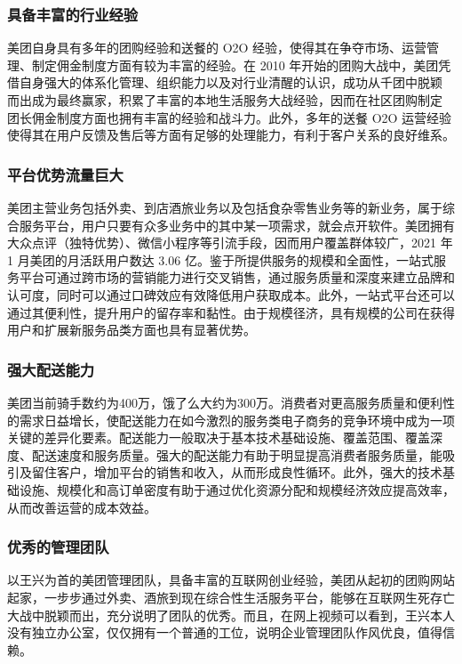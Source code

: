 \documentclass[UTF8,a4paper,12pt,lang=cn,fontset = windows]{elegantpaper} %
\begin{document}
\subsubsection{具备丰富的行业经验}
美团自身具有多年的团购经验和送餐的 O2O 经验，使得其在争夺市场、运营管
理、制定佣金制度方面有较为丰富的经验。在 2010 年开始的团购大战中，美团凭
借自身强大的体系化管理、组织能力以及对行业清醒的认识，成功从千团中脱颖
而出成为最终赢家，积累了丰富的本地生活服务大战经验，因而在社区团购制定
团长佣金制度方面也拥有丰富的经验和战斗力。此外，多年的送餐 O2O 运营经验
使得其在用户反馈及售后等方面有足够的处理能力，有利于客户关系的良好维系。
\subsubsection{平台优势流量巨大}
美团主营业务包括外卖、到店酒旅业务以及包括食杂零售业务等的新业务，属于综合服务平台，用户只要有众多业务中的其中某一项需求，就会点开软件。美团拥有大众点评（独特优势）、微信小程序等引流手段，因而用户覆盖群体较广，2021 年 1 月美团的月活跃用户数达 3.06 亿。鉴于所提供服务的规模和全面性，一站式服务平台可通过跨市场的营销能力进行交叉销售，通过服务质量和深度来建立品牌和认可度，同时可以通过口碑效应有效降低用户获取成本。此外，一站式平台还可以通过其便利性，提升用户的留存率和黏性。由于规模径济，具有规模的公司在获得用户和扩展新服务品类方面也具有显著优势。
\subsubsection{强大配送能力}
美团当前骑手数约为400万，饿了么大约为300万。消费者对更高服务质量和便利性的需求日益增长，使配送能力在如今激烈的服务类电子商务的竞争环境中成为一项关键的差异化要素。配送能力一般取决于基本技术基础设施、覆盖范围、覆盖深度、配送速度和服务质量。强大的配送能力有助于明显提高消费者服务质量，能吸引及留住客户，增加平台的销售和收入，从而形成良性循环。此外，强大的技术基础设施、规模化和高订单密度有助于通过优化资源分配和规模经济效应提高效率，从而改善运营的成本效益。
\subsubsection{优秀的管理团队}
以王兴为首的美团管理团队，具备丰富的互联网创业经验，美团从起初的团购网站起家，一步步通过外卖、酒旅到现在综合性生活服务平台，能够在互联网生死存亡大战中脱颖而出，充分说明了团队的优秀。而且，在网上视频可以看到，王兴本人没有独立办公室，仅仅拥有一个普通的工位，说明企业管理团队作风优良，值得信赖。
\end{document}
